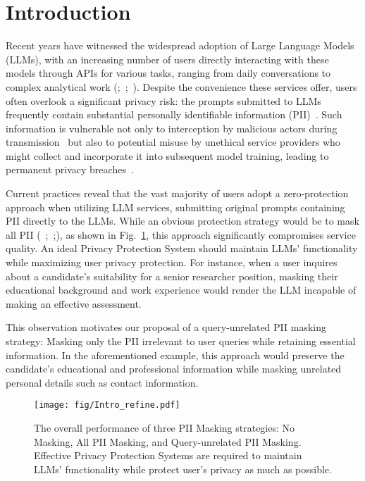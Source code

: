 

\section{Introduction}

Recent years have witnessed the widespread adoption of Large Language Models (LLMs), with an increasing number of users directly interacting with these models through APIs for various tasks, ranging from daily conversations to complex analytical work (\citealp{sun2023textclassificationlargelanguage};~\citealp{yang2024zhongjing};~\citealp{WONG2023253}).
Despite the convenience these services offer, users often overlook a significant privacy risk: 
the prompts submitted to LLMs frequently contain substantial personally identifiable information (PII)~\citep{achiam2023gpt}.
Such information is vulnerable not only to interception by malicious actors during transmission~\citep{parast2022cloud} but also to potential misuse by unethical service providers who might collect and incorporate it into subsequent model training, leading to permanent privacy breaches~\citep{liu2023trustworthy}.

Current practices reveal that the vast majority of users adopt a zero-protection approach when utilizing LLM services, submitting original prompts containing PII directly to the LLMs.
While an obvious protection strategy would be to mask all PII (~\citealp{nakamura2020kart};~\citealp{biesner2022anonymization};\citealp{lukas2023analyzing}), as shown in Fig.~\ref{fig:intro}, this approach significantly compromises service quality.
An ideal Privacy Protection System should maintain LLMs' functionality while maximizing user privacy protection.
For instance, when a user inquires about a candidate's suitability for a senior researcher position, masking their educational background and work experience would render the LLM incapable of making an effective assessment.

This observation motivates our proposal of a query-unrelated PII masking strategy:
Masking only the PII irrelevant to user queries while retaining essential information.
In the aforementioned example, this approach would preserve the candidate's educational and professional information while masking unrelated personal details such as contact information.

\begin{figure}[t]
  \texttt{[image: fig/Intro\_refine.pdf]}
  \caption{The overall performance of three PII Masking strategies: No Masking, All PII Masking, and Query-unrelated PII Masking.
  Effective Privacy Protection Systems are required to maintain LLMs' functionality while protect user's privacy as much as possible.}
  \label{fig:intro}
  \vspace{-5mm}
\end{figure}



